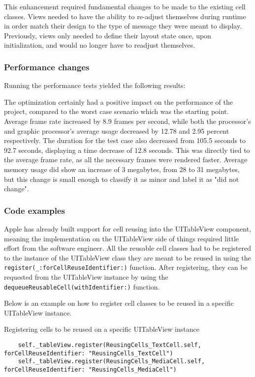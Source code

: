 \documentclass[a4paper,12pt]{article}
\begin{document}
This enhancement required fundamental changes to be made to the existing cell classes. Views needed to have the ability to re-adjust themselves during runtime in order match their design to the type of message they were meant to display. Previously, views only needed to define their layout state once, upon initialization, and would no longer have to readjust themselves.

\subsubsection{Performance changes}
Running the performance tests yielded the following results:

The optimization certainly had a positive impact on the performance of the project, compared to the worst case scenario which was the starting point. Average frame rate increased by 8.9 frames per second, while both the processor's and graphic processor's average usage decreased by 12.78 and 2.95 percent respectively. The duration for the test case also decreased from 105.5 seconds to 92.7 seconds, displaying a time decrease of 12.8 seconds. This was directly tied to the average frame rate, as all the necessary frames were rendered faster. Average memory usage did show an increase of 3 megabytes, from 28 to 31 megabytes, but this change is small enough to classify it as minor and label it as "did not change".

\subsubsection{Code examples}
Apple has already built support for cell reusing into the UITableView component, meaning the implementation on the UITableView side of things required little effort from the software engineer. All the reusable cell classes had to be registered to the instance of the UITableView class they are meant to be reused in using the \texttt{register(_:forCellReuseIdentifier:)} function.\cite{AppleRegisterMethod} After registering, they can be requested from the UITableView instance by using the \texttt{dequeueReusableCell(withIdentifier:)} function.\cite{AppleDequeueReusableCellMethod}

\newpage %
Below is an example on how to register cell classes to be reused in a specific UITableView instance.
\begin{listing}[H]
  \caption{Registering cells to be reused on a specific UITableView instance}
  \begin{verbatim}
    self._tableView.register(ReusingCells_TextCell.self, forCellReuseIdentifier: "ReusingCells_TextCell")
    self._tableView.register(ReusingCells_MediaCell.self, forCellReuseIdentifier: "ReusingCells_MediaCell")
  \end{verbatim}
\end{listing}
\end{document}
